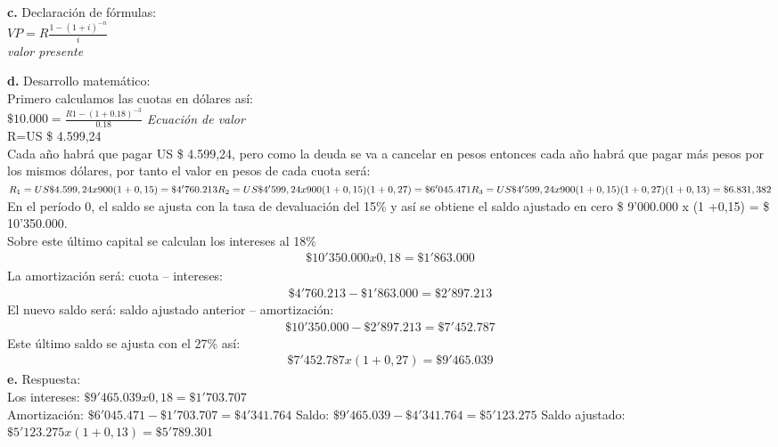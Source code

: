 \textbf{c.}	Declaración de fórmulas:\\


	$VP=R \frac{1-(1+i)^{-n}}{i}$\\\hspace{35pt} \textit{valor presente} 

\textbf{d.}	Desarrollo matemático:\\
Primero calculamos las cuotas en dólares así:\\


	$\$10.000=\frac{R 1-(1+0.18)^{-3}}{0.18}$ \hspace{35pt} \textit{Ecuación de valor}\\
	
	R=US \$ 4.599,24\\
	

Cada año habrá que pagar US \$ 4.599,24, pero como la deuda se va a cancelar en pesos entonces cada año habrá que pagar más pesos por los mismos dólares, por tanto el valor en pesos de cada cuota será:\\


	$R_{1}  = US\$4.599,24 x 900(1 +0,15)=\$4'760.213 \\
	R_{2}  = US\$4'599,24 x 900(1 +0,15)(1+0,27)=\$6'045.471 \\
	R_{3}  = US\$4'599,24 x 900(1 +0,15)(1+0,27)(1+0,13)=\$6.831,382$\\

En el período 0, el saldo se ajusta con la tasa de devaluación del 15\% y así se obtiene el saldo ajustado en cero \$ 9'000.000 x (1 +0,15) = \$ 10'350.000.\\

Sobre este último capital se calculan los intereses al 18\%
\begin{align*}
	\$ 10'350.000 x 0,18=\$ 1'863.000
\end{align*}
La amortización será: cuota – intereses:
\begin{align*}
	\$ 4'760.213 -\$1'863.000 =  \$2'897.213
\end{align*}
El nuevo saldo será: saldo ajustado anterior – amortización:
\begin{align*}
	\$ 10'350.000-\$ 2'897.213 =\$ 7'452.787 
\end{align*}
Este último saldo se ajusta con el 27\% así: 
\begin{align*}
	\$7'452.787 x (1 +0,27) = \$9'465.039
\end{align*}
\textbf{e.}	Respuesta:\\
Los intereses:	$\$ 9'465.039 x 0,18=\$ 1' 703.707$\\
Amortización: 	$\$ 6'045.471 -\$ 1'703.707=\$ 4'341. 764$
Saldo: 		$\$ 9'465.039 -\$ 4'341.764=\$ 5'123.275$		
Saldo ajustado:	$\$ 5'123.275 x (1 + 0,13)=\$ 5'789.301$



